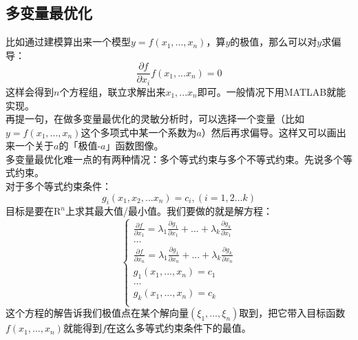 \documentclass[11pt,a4paper]{article}
\begin{document}
\subsection{多变量最优化}
\indent\setlength{\parindent}{2em}比如通过建模算出来一个模型$y=f(x_1,...,x_n)$，算$y$的极值，那么可以对$y$求偏导：
\begin{equation*}
	\frac{\partial f}{\partial x_i} f(x_1,...x_n)=0
\end{equation*}
这样会得到$n$个方程组，联立求解出来$x_1,...x_n$即可。一般情况下用MATLAB就能实现。\\
\indent\setlength{\parindent}{2em}再提一句，在做多变量最优化的灵敏分析时，可以选择一个变量（比如$y=f(x_1,...,x_n)$这个多项式中某一个系数为$a$）然后再求偏导。这样又可以画出来一个关于$a$的「极值-$a$」函数图像。\\
\indent\setlength{\parindent}{2em}多变量最优化难一点的有两种情况：多个等式约束与多个不等式约束。先说多个等式约束。\\
\indent\setlength{\parindent}{2em}对于多个等式约束条件：
\begin{equation*}
	g_i(x_1,x_2,...x_n)=c_i, (i=1,2...k)
\end{equation*}
目标是要在$\mathrm{R}^n$上求其最大值/最小值。我们要做的就是解方程：\\
\begin{equation*}
	\begin{cases}
		\frac{\partial f}{\partial x_1}=\lambda_1\frac{\partial g_1}{\partial x_1}+...+\lambda_k\frac{\partial g_k}{\partial x_1}\\
		...\\
		\frac{\partial f}{\partial x_n}=\lambda_1\frac{\partial g_1}{\partial x_n}+...+\lambda_k\frac{\partial g_k}{\partial x_n}\\
		g_1(x_1,...,x_n)=c_1\\
		...\\
		g_k(x_1,...,x_n)=c_k\\
	\end{cases}
\end{equation*}
这个方程的解告诉我们极值点在某个解向量$(\xi_1,...,\xi_ n)$取到，把它带入目标函数$f(x_1,...,x_n)$就能得到$f$在这么多等式约束条件下的最值。\\
\end{document}
